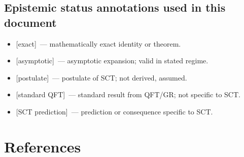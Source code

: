 \documentclass[12pt,a4paper]{article}
\theoremstyle{definition}
\theoremstyle{remark}
\newcommand{\exact}{\textcolor{blue!70!black}{\textsf{[exact]}}}
\newcommand{\approxstep}{\textcolor{orange!80!black}{\textsf{[asymptotic]}}}
\newcommand{\postul}{\textcolor{red!70!black}{\textsf{[postulate]}}}
\newcommand{\stdqft}{\textcolor{teal!80!black}{\textsf{[standard QFT]}}}
\newcommand{\sctpred}{\textcolor{purple!80!black}{\textsf{[SCT prediction]}}}
\begin{document}
\subsection*{Epistemic status annotations used in this document}

\begin{itemize}
\item \exact\ --- mathematically exact identity or theorem.
\item \approxstep\ --- asymptotic expansion; valid in stated regime.
\item \postul\ --- postulate of SCT; not derived, assumed.
\item \stdqft\ --- standard result from QFT/GR; not specific to SCT.
\item \sctpred\ --- prediction or consequence specific to SCT.
\end{itemize}


\section*{References}
\end{document}
